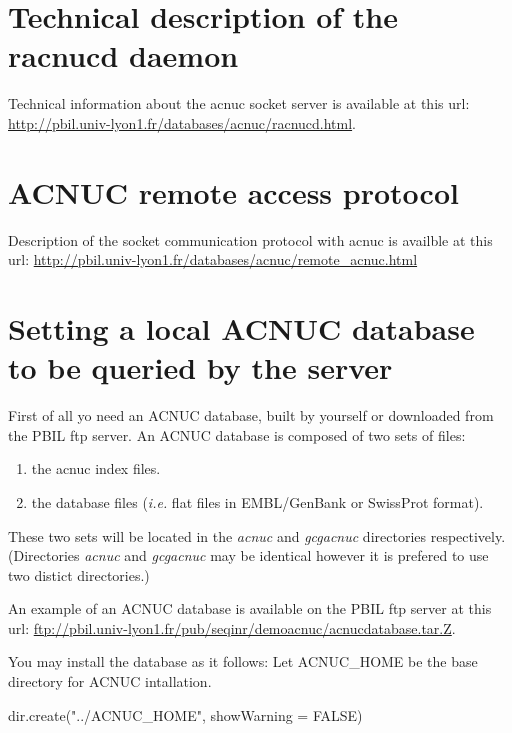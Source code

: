 \documentclass{article}
\begin{document}
\section{Technical description of the racnucd daemon}
Technical information about the acnuc socket server is available at this url:
\url{http://pbil.univ-lyon1.fr/databases/acnuc/racnucd.html}.


\section{ACNUC remote access protocol}
Description of the socket communication protocol with acnuc is availble at this url:
\url{http://pbil.univ-lyon1.fr/databases/acnuc/remote_acnuc.html}

\section{Setting a local ACNUC database to be queried by the server}

First of all yo need an ACNUC database, built by yourself or  downloaded from the PBIL ftp server.
An ACNUC database is composed of two sets of files:
\begin{enumerate}
	\item  the acnuc index files.
	\item  the database files (\textit{i.e.} flat files in EMBL/GenBank or SwissProt format).
\end{enumerate}

These two sets will be located  in the \textit{acnuc} and  \textit{gcgacnuc} directories  respectively.
(Directories \textit{acnuc} and  \textit{gcgacnuc} may be identical however it is prefered to use two distict directories.)

An example of an ACNUC database is available on the PBIL ftp server  at this url:
\url{ftp://pbil.univ-lyon1.fr/pub/seqinr/demoacnuc/acnucdatabase.tar.Z}.
 
You may install the database as it follows:
Let ACNUC\_HOME be the base directory for ACNUC intallation.

\begin{Schunk}
\begin{Sinput}
 dir.create("../ACNUC_HOME", showWarning = FALSE)
\end{Sinput}
\end{Schunk}
\end{document}
